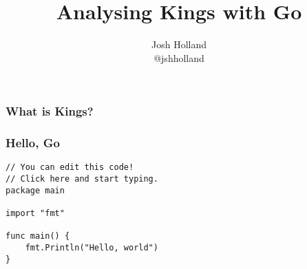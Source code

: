 \documentclass{beamer}
\title{Analysing Kings with Go}
\author{Josh Holland \\ @jshholland}
\date{}
\begin{document}
\lstset{language=go,
  tabsize=4,
  showstringspaces=false}

\frame{\titlepage}

\begin{frame}
\frametitle{What is Kings?}
\end{frame}

\begin{frame}[fragile]
\frametitle{Hello, Go}

\begin{lstlisting}	
// You can edit this code!
// Click here and start typing.
package main

import "fmt"

func main() {
    fmt.Println("Hello, world")
}
\end{lstlisting}

\end{frame}
\end{document}
